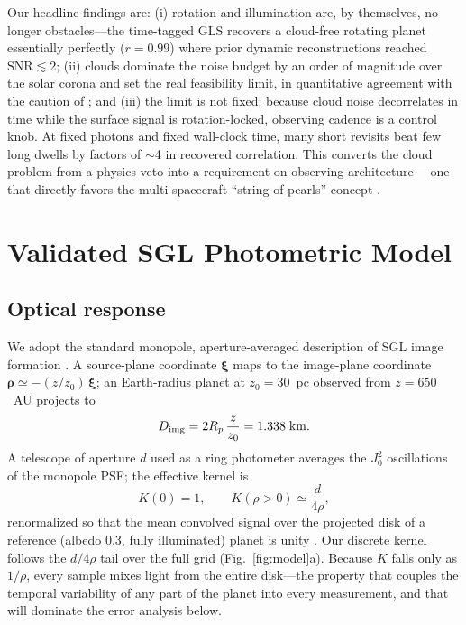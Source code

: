 ﻿\documentclass[twocolumn]{emulateapj}
\begin{document}
Our headline findings are: (i) rotation and illumination are, by
themselves, no longer obstacles---the time-tagged GLS recovers a
cloud-free rotating planet essentially perfectly ($r=0.99$) where prior
dynamic reconstructions reached $\mathrm{SNR}\lesssim2$; (ii) clouds
dominate the noise budget by an order of magnitude over the solar corona
and set the real feasibility limit, in quantitative agreement with the
caution of \citet{toth25clouds}; and (iii) the limit is not fixed: because
cloud noise decorrelates in time while the surface signal is
rotation-locked, observing cadence is a control knob. At fixed photons
and fixed wall-clock time, many short revisits beat few long dwells by
factors of $\sim$4 in recovered correlation. This converts the cloud
problem from a physics veto into a requirement on observing architecture
---one that directly favors the multi-spacecraft ``string of pearls''
concept \citep{helvajian23}.

\section{Validated SGL Photometric Model}
\label{sec:model}

\subsection{Optical response}
We adopt the standard monopole, aperture-averaged description of SGL
image formation \citep{tt20psf,toth21,tur26bench}. A source-plane
coordinate $\boldsymbol{\xi}$ maps to the image-plane coordinate
$\boldsymbol{\rho}\simeq-(z/z_0)\,\boldsymbol{\xi}$; an Earth-radius
planet at $z_0=30$~pc observed from $z=650$~AU projects to
\begin{equation}
D_{\rm img}=2R_p\,\frac{z}{z_0}=1.338\;{\rm km}.
\end{equation}
A telescope of aperture $d$ used as a ring photometer averages the
$J_0^2$ oscillations of the monopole PSF; the effective kernel is
\begin{equation}
K(0)=1,\qquad K(\rho>0)\simeq\frac{d}{4\rho},
\label{eq:kernel}
\end{equation}
renormalized so that the mean convolved signal over the projected disk
of a reference (albedo 0.3, fully illuminated) planet is unity
\citep{tur26bench}. Our discrete kernel follows the $d/4\rho$ tail over
the full grid (Fig.~\ref{fig:model}a). Because $K$ falls only as
$1/\rho$, every sample mixes light from the entire disk---the property
that couples the temporal variability of any part of the planet into
every measurement, and that will dominate the error analysis below.
\end{document}
